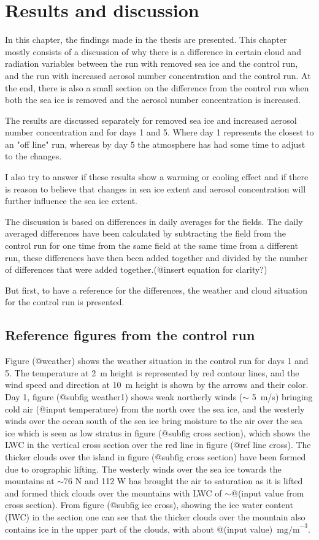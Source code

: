 \chapter{Results and discussion}
\label{chap:results}
In this chapter, the findings made in the thesis are presented. This chapter mostly consists of a discussion of why there is a difference in certain cloud and radiation variables between the run with removed sea ice and the control run, and the run with increased aerosol number concentration and the control run. At the end, there is also a small section on the difference from the control run when both the sea ice is removed and the aerosol number concentration is increased.

The results are discussed separately for removed sea ice and increased aerosol number concentration and for days 1 and 5. Where day 1 represents the closest to an "off line" run, whereas by day 5 the atmosphere has had some time to adjust to the changes.

I also try to answer if these results show a warming or cooling effect and if there is reason to believe that changes in sea ice extent and aerosol concentration will further influence the sea ice extent.

The discussion is based on differences in daily averages for the fields. The daily averaged differences have been calculated by subtracting the field from the control run for one time from the same field at the same time from a different run, these differences have then been added together and divided by the number of differences that were added together.(@insert equation for clarity?)

But first, to have a reference for the differences, the weather and cloud situation for the control run is presented.

\section{Reference figures from the control run}
Figure (@weather) shows the weather situation in the control run for days 1 and 5. The temperature at 2~m height is represented by red contour lines, and the wind speed and direction at 10~m height is shown by the arrows and their color. Day 1, figure (@subfig weather1) shows weak northerly winds ($\sim$ 5~m/s) bringing cold air (@input temperature) from the north over the sea ice, and the westerly winds over the ocean south of the sea ice bring moisture to the air over the sea ice which is seen as low stratus in figure (@subfig cross section), which shows the LWC in the vertical cross section over the red line in figure (@ref line cross). The thicker clouds over the island in figure (@subfig cross section) have been formed due to orographic lifting. The westerly winds over the sea ice towards the mountains at $\sim$76 N and 112 W has brought the air to saturation as it is lifted and formed thick clouds over the mountains with LWC of $\sim$@(input value from cross section). From figure (@subfig ice cross), showing the ice water content (IWC) in the section one can see that the thicker clouds over the mountain also contains ice in the upper part of the clouds, with about @(input value)~$\text{mg/m}^{-3}$. 

